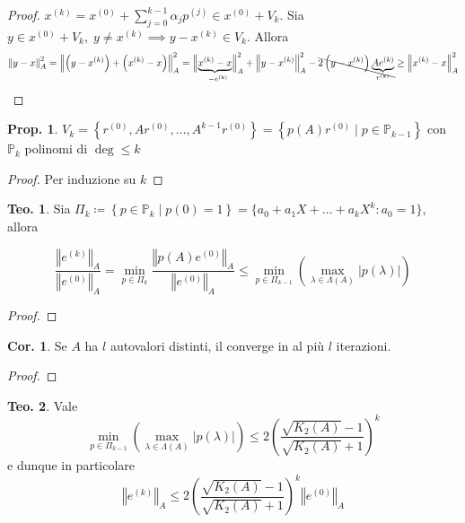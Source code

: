 \documentclass[a4paper,10pt]{article}
\theoremstyle{definition}
\theoremstyle{indentdefinition}
\theoremstyle{indenttheorem}
\newtheorem{thm}{Teo.}
\newtheorem{prop}{Prop.}
\newtheorem{cor}{Cor.}
\theoremstyle{myremark}
\theoremstyle{indentgeneral}
\theoremstyle{plain}
\theoremstyle{plain}
\begin{document}
\begin{proof} $x^{(k)}=x^{(0)}+\sum_{j=0}^{k-1}\alpha_jp^{(j)}\in x^{(0)}+V_k$. Sia $y\in x^{(0)}+V_k,\; y\ne x^{(k)}\implies y-x^{(k)}\in V_k $. Allora
$$\left\Vert y-x\right\Vert^2_{A}=\left\Vert \left(y-x^{\left(k\right)}\right)+\left(x^{\left(k\right)}-x\right)\right\Vert^2 _{A}=\underset{-e^{\left(k\right)}}{\left\Vert \underbrace{x^{\left(k\right)}-x}\right\Vert^2_{A}}+\left\Vert y-x^{\left(k\right)}\right\Vert^2_{A}-\bcancel{2\left(y-x^{\left(k\right)}\right)\underset{r^{\left(k\right)}}{\underbrace{Ae^{\left(k\right)}}}}\ge \left\Vert x^{\left(k\right)}-x\right\Vert^2_{A} $$
\end{proof}
\begin{prop}
$V_{k}=\left\{ r^{\left(0\right)},Ar^{\left(0\right)},\ldots,A^{k-1}r^{\left(0\right)}\right\} =\left\{ p\left(A\right)r^{\left(0\right)}\mid p\in\mathbb{P}_{k-1}\right\} $
con $\mathbb{P}_{k}$ polinomi di $\deg\leq k$
\end{prop}

\begin{proof}
Per induzione su $k$
\end{proof}
\begin{thm}
Sia $\Pi_{k}\coloneqq\left\{ p\in\mathbb{P}_{k}\mid p\left(0\right)=1\right\}=\{a_0+a_1X+\dots+a_kX^k:a_0=1\} $, allora

$$\frac{\left\Vert e^{\left(k\right)}\right\Vert _{A}}{\left\Vert e^{\left(0\right)}\right\Vert _{A}}=\min_{p\in\Pi_{k}}\frac{\left\Vert p\left(A\right)e^{\left(0\right)}\right\Vert _{A}}{\left\Vert e^{\left(0\right)}\right\Vert _{A}}\leq\min_{p\in\Pi_{k-1}}\left(\max_{\lambda\in\Lambda\left(A\right)}\left|p\left(\lambda\right)\right|\right)$$

\end{thm}

\begin{proof}
\end{proof}
\begin{cor}
Se $A$ ha $l$ autovalori distinti, il 
converge in al più $l$ iterazioni.
\end{cor}

\begin{proof}
\end{proof}
\begin{thm}
\label{thm:stima-errore-gradiente-coniugato}Vale 
$$\min_{p\in\Pi_{k-1}}\left(\max_{\lambda\in\Lambda\left(A\right)}\left|p\left(\lambda\right)\right|\right)\leq2\left(\frac{\sqrt{K_{2}\left(A\right)}-1}{\sqrt{K_{2}\left(A\right)}+1}\right)^{k}$$
e dunque in particolare $$\left\Vert e^{\left(k\right)}\right\Vert _{A}\leq2\left(\frac{\sqrt{K_{2}\left(A\right)}-1}{\sqrt{K_{2}\left(A\right)}+1}\right)^{k}\left\Vert e^{\left(0\right)}\right\Vert _{A}$$
\end{thm}
\end{document}
